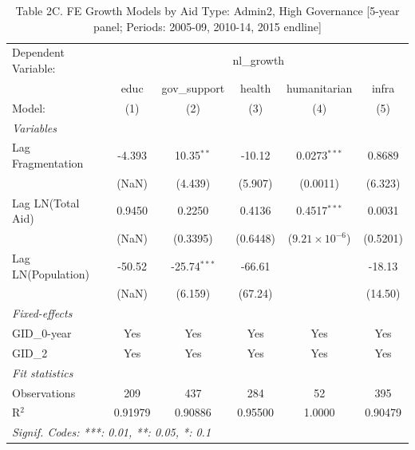 \begin{table}[H]
   \caption{Table 2C. FE Growth Models by Aid Type: Admin2, High Governance [5-year panel; Periods: 2005-09, 2010-14, 2015 endline]}
   \centering
   \begin{tabular}{lccccc}
      \tabularnewline \midrule \midrule
      Dependent Variable: & \multicolumn{5}{c}{nl\_growth}\\
                         & educ    & gov\_support   & health   & humanitarian            & infra \\   
      Model:             & (1)     & (2)            & (3)      & (4)                     & (5)\\  
      \midrule
      \emph{Variables}\\
      Lag Fragmentation  & -4.393  & 10.35$^{**}$   & -10.12   & 0.0273$^{***}$          & 0.8689\\   
                         & (NaN)   & (4.439)        & (5.907)  & (0.0011)                & (6.323)\\   
      Lag LN(Total Aid)  & 0.9450  & 0.2250         & 0.4136   & 0.4517$^{***}$          & 0.0031\\   
                         & (NaN)   & (0.3395)       & (0.6448) & ($9.21\times 10^{-6}$)  & (0.5201)\\   
      Lag LN(Population) & -50.52  & -25.74$^{***}$ & -66.61   &                         & -18.13\\   
                         & (NaN)   & (6.159)        & (67.24)  &                         & (14.50)\\   
      \midrule
      \emph{Fixed-effects}\\
      GID\_0-year        & Yes     & Yes            & Yes      & Yes                     & Yes\\  
      GID\_2             & Yes     & Yes            & Yes      & Yes                     & Yes\\  
      \midrule
      \emph{Fit statistics}\\
      Observations       & 209     & 437            & 284      & 52                      & 395\\  
      R$^2$              & 0.91979 & 0.90886        & 0.95500  & 1.0000                  & 0.90479\\  
      \midrule \midrule
      \multicolumn{6}{l}{\emph{Signif. Codes: ***: 0.01, **: 0.05, *: 0.1}}\\
   \end{tabular}
\end{table}



